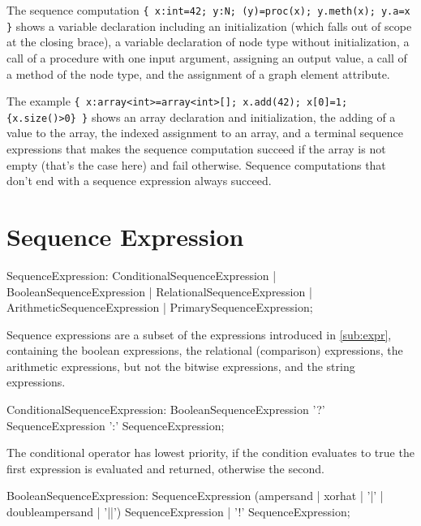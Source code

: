\begin{example}
The sequence computation \verb#{ x:int=42; y:N; (y)=proc(x); y.meth(x); y.a=x }# shows a variable declaration including an initialization (which falls out of scope at the closing brace), a variable declaration of node type without initialization, a call of a procedure with one input argument, assigning an output value, a call of a method of the node type, and the assignment of a graph element attribute.

The example \verb#{ x:array<int>=array<int>[]; x.add(42); x[0]=1; {x.size()>0} }# shows an array declaration and initialization, the adding of a value to the array, the indexed assignment to an array, and a terminal sequence expressions that makes the sequence computation succeed if the array is not empty (that's the case here) and fail otherwise. Sequence computations that don't end with a sequence expression always succeed.
\end{example}

\section{Sequence Expression} \label{sec:seqexpr}

\begin{rail}
  SequenceExpression:  
    ConditionalSequenceExpression |
    BooleanSequenceExpression |
    RelationalSequenceExpression |
    ArithmeticSequenceExpression |
    PrimarySequenceExpression;
\end{rail}

Sequence expressions are a subset of the expressions introduced in \ref{sub:expr}, containing 
the boolean expressions,
the relational (comparison) expressions,
the arithmetic expressions, but not the bitwise expressions,
and the string expressions.

\begin{rail}
  ConditionalSequenceExpression: 
    BooleanSequenceExpression '?' SequenceExpression ':' SequenceExpression;
\end{rail}

The conditional operator has lowest priority, if the condition evaluates to true the first expression is evaluated and returned, otherwise the second.

\begin{rail}
  BooleanSequenceExpression: 
    SequenceExpression (ampersand | xorhat | '|' | doubleampersand | '||') SequenceExpression |
    '!' SequenceExpression;
\end{rail}

